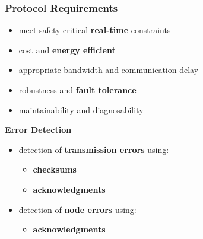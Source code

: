 \documentclass{beamer}
\renewcommand{\emph}[1]{\textbf{\textcolor{greeniot2}{#1}}}
\newcommand{\paragraph}[1]{\vspace{6pt}\textbf{#1}}
\begin{document}
\begin{frame}
  \frametitle{Protocol Requirements}
  
  \begin{itemize}
    \item meet safety critical \emph{real-time} constraints
    \item cost and \emph{energy efficient}
    \item appropriate bandwidth and communication delay
    \item robustness and \emph{fault tolerance}
    \item maintainability and diagnosability
  \end{itemize}
  
  \paragraph{Error Detection}
  \begin{itemize}
    \item detection of \emph{transmission errors} using:
      \begin{itemize}
        \item \emph{checksums}
        \item \emph{acknowledgments}
      \end{itemize}
    \item detection of \emph{node errors} using:
      \begin{itemize}
        \item \emph{acknowledgments}
      \end{itemize}
  \end{itemize}
\end{frame}
\end{document}
